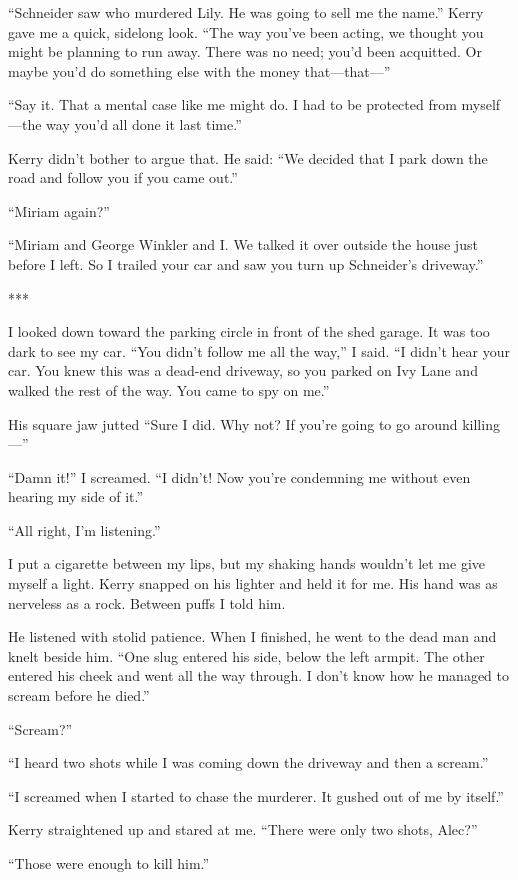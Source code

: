\documentclass{novel}
\begin{document}
{“Schneider saw who murdered Lily. He was going to sell me the name.” Kerry gave me a quick, sidelong look. “The way you’ve been acting, we thought you might be planning to run away. There was no need; you’d been acquitted. Or maybe you’d do something else with the money that—that—”

“Say it. That a mental case like me might do. I had to be protected from myself—the way you’d all done it last time.”

Kerry didn’t bother to argue that. He said: “We decided that I park down the road and follow you if you came out.”

“Miriam again?”

“Miriam and George Winkler and I. We talked it over outside the house just before I left. So I trailed your car and saw you turn up Schneider’s driveway.”

***

I looked down toward the parking circle in front of the shed garage. It was too dark to see my car. “You didn’t follow me all the way,” I said. “I didn’t hear your car. You knew this was a dead-end driveway, so you parked on Ivy Lane and walked the rest of the way. You came to spy on me.”

His square jaw jutted “Sure I did. Why not? If you’re going to go around killing—”

“Damn it!” I screamed. “I didn’t! Now you’re condemning me without even hearing my side of it.”

“All right, I’m listening.”

I put a cigarette between my lips, but my shaking hands wouldn’t let me give myself a light. Kerry snapped on his lighter and held it for me. His hand was as nerveless as a rock. Between puffs I told him.

He listened with stolid patience. When I finished, he went to the dead man and knelt beside him. “One slug entered his side, below the left armpit. The other entered his cheek and went all the way through. I don’t know how he managed to scream before he died.”

“Scream?”

“I heard two shots while I was coming down the driveway and then a scream.”

“I screamed when I started to chase the murderer. It gushed out of me by itself.”

Kerry straightened up and stared at me. “There were only two shots, Alec?”

“Those were enough to kill him.”

}
\end{document}
